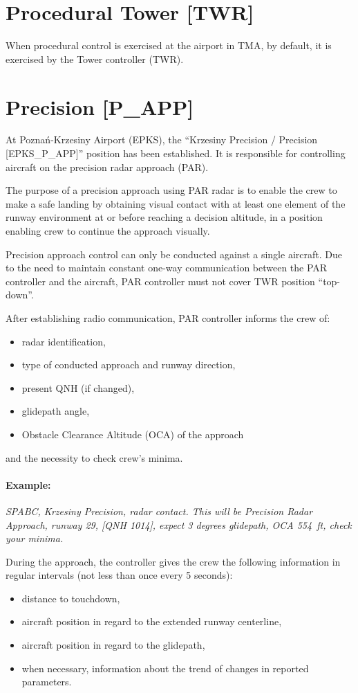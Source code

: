 \section{Procedural Tower [TWR]}
When procedural control is exercised at the airport in TMA, by default, it is exercised by the Tower controller (TWR).

\section{Precision [P\_APP]}
At Poznań-Krzesiny Airport (EPKS), the ``Krzesiny Precision / Precision [EPKS\_P\_APP]'' position has been established. It is responsible for controlling aircraft on the precision radar approach (PAR).

The purpose of a precision approach using PAR radar is to enable the crew to make a safe landing by obtaining visual contact with at least one element of the runway environment at or before reaching a decision altitude, in a position enabling crew to continue the approach visually.

Precision approach control can only be conducted against a single aircraft. Due to
the need to maintain constant one-way communication between the PAR controller and the aircraft, PAR controller must not cover TWR position ``top-down''.

After establishing radio communication, PAR controller informs the crew of:
\begin{itemize}
    \item radar identification,
    \item type of conducted approach and runway direction,
    \item present QNH (if changed),
    \item glidepath angle,
    \item Obstacle Clearance Altitude (OCA) of the approach
\end{itemize}
and the necessity to check crew's minima.

\paragraph{Example:} \textit{SPABC, Krzesiny Precision, radar contact. This will be Precision Radar Approach, runway 29, [QNH 1014], expect 3 degrees glidepath, OCA 554~ft, check your minima.}

During the approach, the controller gives the crew  the following information in regular intervals (not less than once every 5 seconds):
\begin{itemize}
    \item distance to touchdown,
    \item aircraft position in regard to the extended runway centerline,
    \item aircraft position in regard to the glidepath,
    \item when necessary, information about the trend of changes in reported parameters.
\end{itemize}

